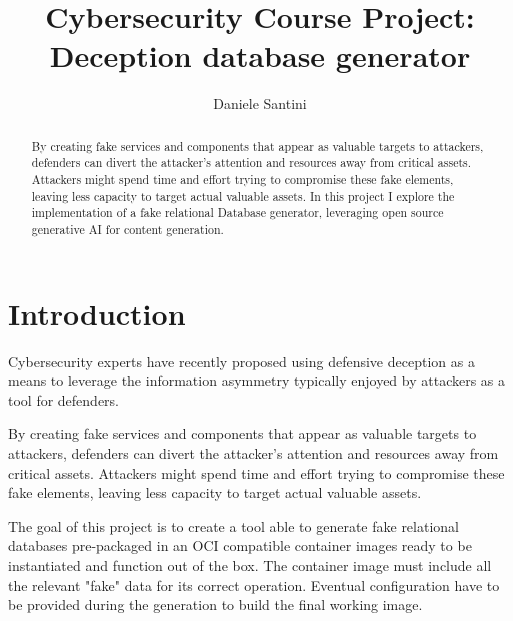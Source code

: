 \documentclass[12pt, letterpaper, twoside]{article}
\title{\textbf{Cybersecurity Course Project:\\Deception database generator}} %
\author{Daniele Santini} %
\affiliation{Alma Mater Studiorum - Università di Bologna} %
\begin{document}
\maketitle

\begin{abstract}
    \noindent
    
    By creating fake services and components that appear as valuable targets to attackers, defenders can divert the attacker's attention and resources away from critical assets. Attackers might spend time and effort trying to compromise these fake elements, leaving less capacity to target actual valuable assets.
    In this project I explore the implementation of a fake relational Database generator, leveraging open source generative AI for content generation.

\end{abstract}

\vspace{2.5cm}


\thispagestyle{firstpage}

\pagebreak


\newgeometry{} %

\section{Introduction}
\label{sec:intro}

Cybersecurity experts have recently proposed using defensive deception as a means to leverage the information asymmetry typically enjoyed by attackers as a tool for defenders.

By creating fake services and components that appear as valuable targets to attackers, defenders can divert the attacker's attention and resources away from critical assets. Attackers might spend time and effort trying to compromise these fake elements, leaving less capacity to target actual valuable assets.

The goal of this project is to create a tool able to generate fake relational databases pre-packaged in an OCI compatible container images ready to be instantiated and function out of the box. The container image must include all the relevant "fake" data for its correct operation. Eventual configuration have to be provided during the generation to build the final working image.
\end{document}
